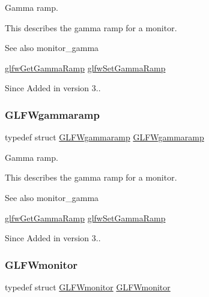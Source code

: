 Gamma ramp. 

This describes the gamma ramp for a monitor.

\begin{DoxySeeAlso}{See also}
monitor\+\_\+gamma 

\hyperlink{group__monitor_gafe7b41852c1a14fe978f0e5381969885}{glfw\+Get\+Gamma\+Ramp} \hyperlink{group__monitor_gac9f36a1cfa10eab191d3029ea8bc9558}{glfw\+Set\+Gamma\+Ramp}
\end{DoxySeeAlso}
\begin{DoxySince}{Since}
Added in version 3.. 
\end{DoxySince}
\mbox{\label{group__monitor_gaec0bd37af673be8813592849f13e02f0}} 
\subsubsection{\texorpdfstring{G\+L\+F\+Wgammaramp}{GLFWgammaramp}\hspace{0.1cm}{\footnotesize\ttfamily [5/5]}}
{\footnotesize\ttfamily typedef struct \hyperlink{structGLFWgammaramp}{G\+L\+F\+Wgammaramp}  \hyperlink{structGLFWgammaramp}{G\+L\+F\+Wgammaramp}}



Gamma ramp. 

This describes the gamma ramp for a monitor.

\begin{DoxySeeAlso}{See also}
monitor\+\_\+gamma 

\hyperlink{group__monitor_gafe7b41852c1a14fe978f0e5381969885}{glfw\+Get\+Gamma\+Ramp} \hyperlink{group__monitor_gac9f36a1cfa10eab191d3029ea8bc9558}{glfw\+Set\+Gamma\+Ramp}
\end{DoxySeeAlso}
\begin{DoxySince}{Since}
Added in version 3.. 
\end{DoxySince}
\mbox{\label{group__monitor_ga8d9efd1cde9426692c73fe40437d0ae3}} 
\subsubsection{\texorpdfstring{G\+L\+F\+Wmonitor}{GLFWmonitor}\hspace{0.1cm}{\footnotesize\ttfamily [1/5]}}
{\footnotesize\ttfamily typedef struct \hyperlink{group__monitor_ga8d9efd1cde9426692c73fe40437d0ae3}{G\+L\+F\+Wmonitor} \hyperlink{group__monitor_ga8d9efd1cde9426692c73fe40437d0ae3}{G\+L\+F\+Wmonitor}}



